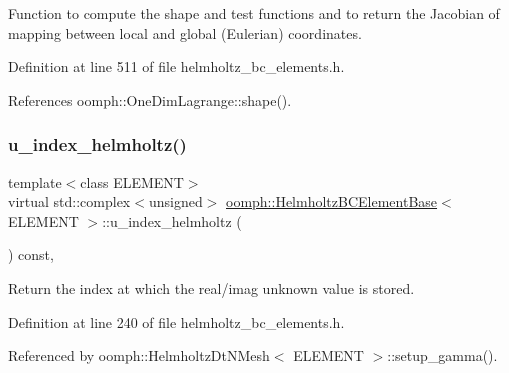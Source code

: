 Function to compute the shape and test functions and to return the Jacobian of mapping between local and global (Eulerian) coordinates. 



Definition at line 511 of file helmholtz\+\_\+bc\+\_\+elements.\+h.



References oomph\+::\+One\+Dim\+Lagrange\+::shape().

\mbox{\label{classoomph_1_1HelmholtzBCElementBase_a756997c0a98903754b30fed24c92091a}} 
\subsubsection{\texorpdfstring{u\+\_\+index\+\_\+helmholtz()}{u\_index\_helmholtz()}}
{\footnotesize\ttfamily template$<$class E\+L\+E\+M\+E\+NT$>$ \\
virtual std\+::complex$<$unsigned$>$ \hyperlink{classoomph_1_1HelmholtzBCElementBase}{oomph\+::\+Helmholtz\+B\+C\+Element\+Base}$<$ E\+L\+E\+M\+E\+NT $>$\+::u\+\_\+index\+\_\+helmholtz (\begin{DoxyParamCaption}{ }\end{DoxyParamCaption}) const\hspace{0.3cm}{\ttfamily [inline]}, {\ttfamily [virtual]}}



Return the index at which the real/imag unknown value is stored. 



Definition at line 240 of file helmholtz\+\_\+bc\+\_\+elements.\+h.



Referenced by oomph\+::\+Helmholtz\+Dt\+N\+Mesh$<$ E\+L\+E\+M\+E\+N\+T $>$\+::setup\+\_\+gamma().

\mbox{\label{classoomph_1_1HelmholtzBCElementBase_a66defe3dfc1150d37015c43c08fd93b1}} 
